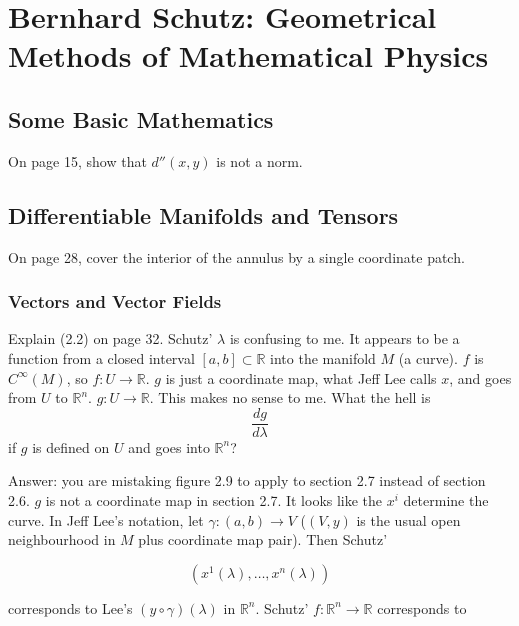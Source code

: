 \documentclass[12pt]{article}
\begin{document}
\section{Bernhard Schutz: Geometrical Methods of Mathematical Physics}
\label{section:schutz}

\subsection{Some Basic Mathematics}
\label{subsection:veecheic}

On page 15, show that $d''(x,y)$ is not a norm.

\subsection{Differentiable Manifolds and Tensors}
\label{subsection:vieghaem}

On page 28, cover the interior of the annulus by a single coordinate
patch.

\subsubsection{Vectors and Vector Fields}
\label{subsubsection:eiciexie}

Explain (2.2) on page 32. Schutz' $\lambda$ is confusing to me. It
appears to be a function from a closed interval
$[a,b]\subset\mathbb{R}$ into the manifold $M$ (a curve). $f$ is
$C^{\infty}(M)$, so $f:U\rightarrow\mathbb{R}$. $g$ is just a
coordinate map, what Jeff Lee calls $x$, and goes from $U$ to
$\mathbb{R}^{n}$. $g:U\rightarrow\mathbb{R}$. This makes no sense to
me. What the hell is 
\begin{equation}
  \label{eq:phohvuoj}
  \frac{dg}{d\lambda}
\end{equation}
if $g$ is defined on $U$ and goes into $\mathbb{R}^{n}$?

Answer: you are mistaking figure 2.9 to apply to section 2.7 instead
of section 2.6. $g$ is not a coordinate map in section 2.7. It looks
like the $x^{i}$ determine the curve. In Jeff Lee's notation, let
$\gamma:(a,b)\rightarrow{}V$ ($(V,y)$ is the usual open neighbourhood
in $M$ plus coordinate map pair). Then Schutz'

\begin{equation}
  \label{eq:eenooroh}
(x^{1}(\lambda),\ldots,x^{n}(\lambda)) 
\end{equation}

corresponds to Lee's
$(y\circ{}\gamma)(\lambda)$ in $\mathbb{R}^{n}$. Schutz'
$f:\mathbb{R}^{n}\rightarrow\mathbb{R}$ corresponds to 
\end{document}
